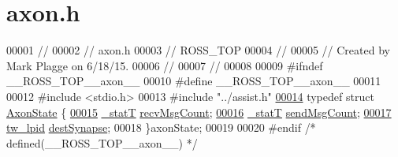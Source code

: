 \hypertarget{axon_8h_source}{}\section{axon.\+h}
\label{axon_8h_source}

\begin{DoxyCode}
00001 \textcolor{comment}{//}
00002 \textcolor{comment}{//  axon.h}
00003 \textcolor{comment}{//  ROSS\_TOP}
00004 \textcolor{comment}{//}
00005 \textcolor{comment}{//  Created by Mark Plagge on 6/18/15.}
00006 \textcolor{comment}{//}
00007 \textcolor{comment}{//}
00008 
00009 \textcolor{preprocessor}{#}\textcolor{preprocessor}{ifndef} \textcolor{preprocessor}{\_\_ROSS\_TOP\_\_axon\_\_}
00010 \textcolor{preprocessor}{#}\textcolor{preprocessor}{define} \textcolor{preprocessor}{\_\_ROSS\_TOP\_\_axon\_\_}
00011 
00012 \textcolor{preprocessor}{#}\textcolor{preprocessor}{include} \textcolor{preprocessor}{<}\textcolor{preprocessor}{stdio}\textcolor{preprocessor}{.}\textcolor{preprocessor}{h}\textcolor{preprocessor}{>}
00013 \textcolor{preprocessor}{#}\textcolor{preprocessor}{include} \textcolor{preprocessor}{"../assist.h"}
\hypertarget{axon_8h_source_l00014}{}\hyperlink{structaxon_state}{00014} \textcolor{keyword}{typedef} \textcolor{keyword}{struct} \hyperlink{structaxon_state}{AxonState} \{
\hypertarget{axon_8h_source_l00015}{}\hyperlink{structaxon_state_a7fc444364b1559859bccdf91f1e95475}{00015}     \hyperlink{assist_8h_ad77e6fc5a9b03d46e7c97b7c4b92e89f}{\_statT} \hyperlink{structaxon_state_a7fc444364b1559859bccdf91f1e95475}{recvMsgCount};
\hypertarget{axon_8h_source_l00016}{}\hyperlink{structaxon_state_a217ba44fb923dc4dc62bb73b14e61517}{00016}     \hyperlink{assist_8h_ad77e6fc5a9b03d46e7c97b7c4b92e89f}{\_statT} \hyperlink{structaxon_state_a217ba44fb923dc4dc62bb73b14e61517}{sendMsgCount};
\hypertarget{axon_8h_source_l00017}{}\hyperlink{structaxon_state_a665999819b255f36d756f17b85bc9a03}{00017}     \hyperlink{structaxon_state_a665999819b255f36d756f17b85bc9a03}{tw\_lpid} \hyperlink{structaxon_state_a665999819b255f36d756f17b85bc9a03}{destSynapse};
00018 \}axonState;
00019 
00020 \textcolor{preprocessor}{#}\textcolor{preprocessor}{endif} \textcolor{comment}{/* defined(\_\_ROSS\_TOP\_\_axon\_\_) */}
\end{DoxyCode}
